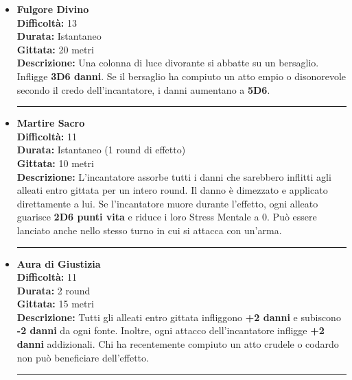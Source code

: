 \documentclass[../manuale_main.tex]{subfiles}
\begin{document}
\begin{itemize}

\item \textbf{Fulgore Divino} \\
\textbf{Difficoltà:} 13 \\
\textbf{Durata:} Istantaneo \\
\textbf{Gittata:} 20 metri \\
\textbf{Descrizione:} Una colonna di luce divorante si abbatte su un bersaglio. Infligge \textbf{3D6 danni}. Se il bersaglio ha compiuto un atto empio o disonorevole secondo il credo dell’incantatore, i danni aumentano a \textbf{5D6}.

\vspace{0.5cm}\rule{\textwidth}{0.4pt}\vspace{1cm}

\item \textbf{Martire Sacro} \\
\textbf{Difficoltà:} 11 \\
\textbf{Durata:} Istantaneo (1 round di effetto) \\
\textbf{Gittata:} 10 metri \\
\textbf{Descrizione:} L’incantatore assorbe tutti i danni che sarebbero inflitti agli alleati entro gittata per un intero round. Il danno è dimezzato e applicato direttamente a lui. Se l'incantatore muore durante l’effetto, ogni alleato guarisce \textbf{2D6 punti vita} e riduce i loro Stress Mentale a 0. Può essere lanciato anche nello stesso turno in cui si attacca con un'arma.

\vspace{0.5cm}\rule{\textwidth}{0.4pt}\vspace{1cm}
\clearpage
\item \textbf{Aura di Giustizia} \\
\textbf{Difficoltà:} 11 \\
\textbf{Durata:} 2 round \\
\textbf{Gittata:} 15 metri \\
\textbf{Descrizione:} Tutti gli alleati entro gittata infliggono \textbf{+2 danni} e subiscono \textbf{-2 danni} da ogni fonte. Inoltre, ogni attacco dell’incantatore infligge \textbf{+2 danni} addizionali. Chi ha recentemente compiuto un atto crudele o codardo non può beneficiare dell’effetto.

\vspace{0.5cm}\rule{\textwidth}{0.4pt}\vspace{1cm}


\end{itemize}
\end{document}
